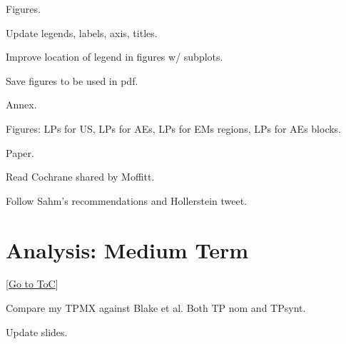 \documentclass[12pt]{article}
\newcommand{\gototoc}{\vspace{-1.8cm} \null\hfill [\hyperlink{toc}{Go to ToC}] \newline}
\begin{document}
\begin{todolist}
	\item Figures.
	\begin{todolist}
		\item Update legends, labels, axis, titles.
		\item Improve location of legend in figures w/ subplots.
		\item Save figures to be used in pdf.
	\end{todolist}

	\item Annex.
	\begin{todolist}
		
		\item Figures: LPs for US, LPs for AEs, LPs for EMs regions, LPs for AEs blocks.
	\end{todolist}
	
	\item Paper.
	\begin{todolist}
		\item Read Cochrane shared by Moffitt.
		\item Follow Sahm's recommendations and Hollerstein tweet.
	\end{todolist}
	
\end{todolist}

\section{Analysis: Medium Term}
\gototoc
\begin{todolist}
	\item Compare my TPMX against Blake et al. Both TP nom and TPsynt.
	\item Update slides.
\end{todolist}
\end{document}
